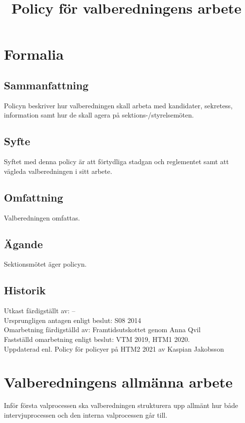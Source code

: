 \documentclass{dsekprotokoll}
\title{Policy för valberedningens arbete}
\author{}
\begin{document}
\maketitle

\section{Formalia}
\subsection{Sammanfattning}
Policyn beskriver hur valberedningen skall arbeta med kandidater, sekretess, information samt
hur de skall agera på sektions-/styrelsemöten.

\subsection{Syfte}
Syftet med denna policy är att förtydliga stadgan och reglementet samt att vägleda valberedningen i sitt arbete.

\subsection{Omfattning}
Valberedningen omfattas.

\subsection{Ägande}
Sektionsmötet äger policyn.
\subsection{Historik}
Utkast färdigställt av: – \\
Ursprungligen antagen enligt beslut: S08 2014\\
Omarbetning färdigställd av: Framtidsutskottet genom Anna Qvil\\
Fastställd omarbetning enligt beslut: VTM 2019, HTM1 2020. \\
Uppdaterad enl. Policy för policyer på HTM2 2021 av Kaspian Jakobsson


\section{Valberedningens allmänna arbete}

Inför första valprocessen ska valberedningen strukturera upp allmänt hur både intervjuprocessen och den
interna valprocessen går till.
\end{document}
